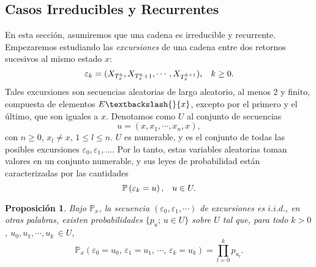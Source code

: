 \documentclass[a4paper]{article}
\newcommand{\prob}{\mathbb{P}}
\newtheorem{prop}{Proposici\'on}
\numberwithin{equation}{subsection}
\begin{document}
\subsection{Casos Irreducibles y Recurrentes}
En esta sección, asumiremos que una cadena es irreducible y recurrente. Empezaremos estudiando las \textit{excursiones} de una cadena entre dos retornos sucesivos al mismo estado $x$:
\[\varepsilon_k = (X_{T_x^k},X_{T_x^k+1},\cdots,X_{T_x^{k+1}}),\hspace{0.3cm}k\geq 0.\]
Tales excursiones son secuencias aleatorias de largo aleatorio, al menos 2 y finito, compuesta de elementos $E\textbackslash{}\{x\}$, excepto por el primero y el último, que son iguales a $x$. Denotamos como $U$ al conjunto de secuencias
\[u = (x,x_1,\cdots,x_n,x),\]
con $n\geq 0$, $x_l\neq x$, $1\leq l \leq n$. $U$ es numerable, y es el conjunto de todas las posibles excursiones $\varepsilon_0,\varepsilon_1,...$. Por lo tanto, estas variables aleatorias toman valores en un conjunto numerable, y sus leyes de probabilidad están caracterizadas por las cantidades
\[\prob\left(\varepsilon_k = u\right),\hspace{0.3cm}u\in U.\]

\begin{prop}
Bajo $\prob_x$, la secuencia $(\varepsilon_0,\varepsilon_1,\cdots)$ de excursiones es $i.i.d.$, en otras palabras, existen probabilidades $\{p_u;\,u\in U\}$ sobre $U$ tal que, para todo $k>0$, $u_0,u_1,\cdots,u_k\,\in U$,
\[\prob_x\left(\varepsilon_0 = u_0,\,\varepsilon_1 = u_1,\,\cdots,\,\varepsilon_k = u_k\right) = \prod_{l=0}^k p_{u_l}.\]
\end{prop}
\end{document}
